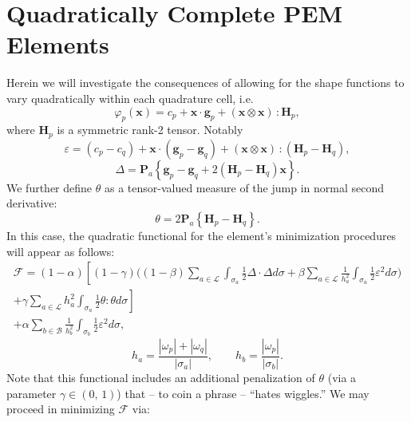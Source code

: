 \documentclass[11pt]{article} %
\begin{document}
\newpage

\section{Quadratically Complete PEM Elements}

Herein we will investigate the consequences of allowing for the shape functions to vary quadratically within each quadrature cell, i.e.
\begin{equation}
	\varphi_p (\mathbf{x}) = c_p + \mathbf{x} \cdot \mathbf{g}_p + (\mathbf{x} \otimes \mathbf{x}) \, \colon \mathbf{H}_{p},
\end{equation}
where $\mathbf{H}_{p}$ is a symmetric rank-2 tensor. Notably
\begin{equation}
	\varepsilon = (c_p - c_q) + \mathbf{x} \cdot (\mathbf{g}_p - \mathbf{g}_q) + (\mathbf{x} \otimes \mathbf{x}) \, \colon (\mathbf{H}_{p} - \mathbf{H}_{q}) ,
\end{equation}
\begin{equation}
	\Delta = \mathbf{P}_a \left\{ \mathbf{g}_p - \mathbf{g}_q + 2 (\mathbf{H}_p - \mathbf{H}_q) \mathbf{x} \right\} .
\end{equation}
We further define $\theta$ as a tensor-valued measure of the jump in normal second derivative:
\begin{equation}
	\theta = 2 \mathbf{P}_a \left\{ \mathbf{H}_p - \mathbf{H}_q \right\} .
\end{equation}
In this case, the quadratic functional for the element's minimization procedures will appear as follows:
\begin{eqnarray}
	\mathcal{F} = (1-\alpha) \left[ (1 - \gamma) \bigg( (1-\beta) \sum_{a \in \mathcal{L}} \int_{\sigma_a} \frac{1}{2} \Delta \cdot \Delta d \sigma + \beta \sum_{a \in \mathcal{L}} \frac{1}{h_a^2} \int_{\sigma_a} \frac{1}{2} \varepsilon^2 d \sigma \bigg) \right. \nonumber \\ + \left. \gamma \sum_{a \in \mathcal{L}} h_a^2 \int_{\sigma_a} \frac{1}{2} \theta \colon \theta d \sigma \right] \nonumber \\ + \alpha \sum_{b \in \mathcal{B}} \frac{1}{h_b^2} \int_{\sigma_b} \frac{1}{2} \varepsilon^2 d \sigma ,
\end{eqnarray}
\begin{equation}
	h_a = \frac{| \omega_p | + | \omega_q |}{| \sigma_a |}, \qquad h_b = \frac{| \omega_p |}{| \sigma_b |}.
\end{equation}
Note that this functional includes an additional penalization of $\theta$ (via a parameter $\gamma \in (0, \, 1)$) that -- to coin a phrase -- ``hates wiggles.'' We may proceed in minimizing $\mathcal{F}$ via:
\end{document}
